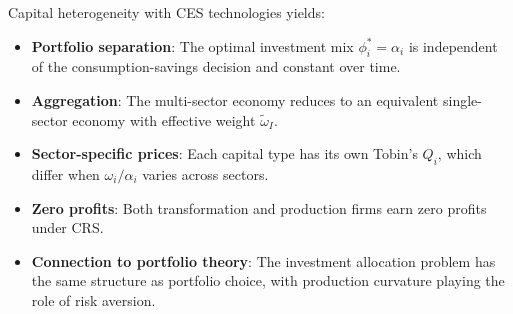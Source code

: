 \begin{callouttip}
Capital heterogeneity with CES technologies yields:
\begin{itemize}[nosep]
\item \textbf{Portfolio separation}: The optimal investment mix $\phi_i^* = \alpha_i$ is independent of the consumption-savings decision and constant over time.
\item \textbf{Aggregation}: The multi-sector economy reduces to an equivalent single-sector economy with effective weight $\tilde{\omega}_I$.
\item \textbf{Sector-specific prices}: Each capital type has its own Tobin's $Q_i$, which differ when $\omega_i / \alpha_i$ varies across sectors.
\item \textbf{Zero profits}: Both transformation and production firms earn zero profits under CRS.
\item \textbf{Connection to portfolio theory}: The investment allocation problem has the same structure as portfolio choice, with production curvature playing the role of risk aversion.
\end{itemize}
\end{callouttip}
